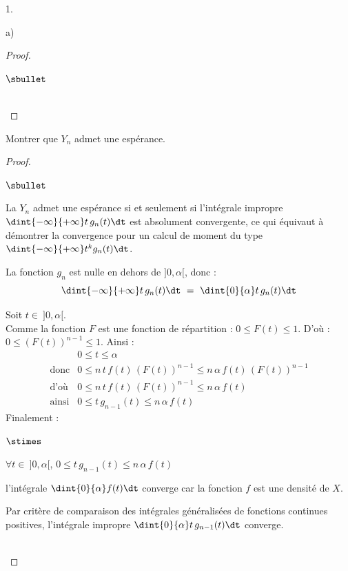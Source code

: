 \documentclass[11pt]{article}%
\begin{document}
\begin{noliste}{1.}
\begin{noliste}{a)}
\begin{proof}
\begin{noliste}{$\sbullet$}
	\conc{Une densité de $Y_n$ est donc $g_n : x \mapsto \left\{
	\begin{array}{cR{2cm}}
	  n \, f(x) \, (F(x))^{n-1} & si $x \in \ ]0,\alpha[$
	  \nl
	  0 & sinon
	\end{array}
	\right.$}
      \end{noliste}
      
      ~\\[-1.4cm]
    \end{proof}

    
    \item Montrer que $Y_n$ admet une espérance.
    
    \begin{proof}~
      \begin{noliste}{$\sbullet$}
	\item La \var $Y_n$ admet une espérance si et seulement si 
	l'intégrale impropre $\dint{-\infty}{+\infty} t \, g_n(t) \dt$
	est absolument convergente, ce qui équivaut à démontrer la 
	convergence pour un calcul de moment du type $\dint{-\infty}
	{+\infty} t^k g_n(t) \dt$.
	
	\item La fonction $g_n$ est nulle en dehors de $]0,\alpha[$,
	donc :
	\[
	  \dint{-\infty}{+\infty} t \, g_n(t) \dt \ = \ 
	  \dint{0}{\alpha} t \, g_n(t) \dt
	\]
	
	
	
	
	\item Soit $t \in \ ]0, \alpha[$.\\
	Comme la fonction $F$ est une fonction de répartition : 
	$0 \leq F(t) \leq 1$. D'où : $0 \leq (F(t))^{n-1} \leq 1$.
	Ainsi :
	\[
	  \begin{array}{cl}
	    & 0 \leq t \leq \alpha
	    \\[.4cm]
	    \text{donc} & 0 \leq n \, t \, f(t) \, (F(t))^{n-1} \leq
	    n \, \alpha \, f(t) \, (F(t))^{n-1}
	    \\[.4cm]
	    \text{d'où} & 0 \leq n \, t \, f(t) \, (F(t))^{n-1} \leq
	    n \, \alpha \, f(t)
	    \\[.4cm]
	    \text{ainsi} & 0 \leq t \, g_{n-1}(t) \leq n \, \alpha \,
	    f(t)
	  \end{array}
	\]
	Finalement :
	\begin{noliste}{$\stimes$}
	  \item $\forall t \in \ ]0,\alpha[$, $0 \leq t \, g_{n-1}(t)
	  \leq n \, \alpha \, f(t)$
	  \item l'intégrale $\dint{0}{\alpha} f(t) \dt$ converge 
	  car la fonction $f$ est une densité de $X$.
	\end{noliste}
	Par critère de comparaison des intégrales généralisées de 
	fonctions continues positives, l'intégrale impropre 
	$\dint{0}{\alpha} t \, g_{n-1}(t) \dt$ converge.
      \end{noliste}
      ~\\[-1.2cm]
      

\end{proof}
\end{noliste}
\end{noliste}
\end{document}
